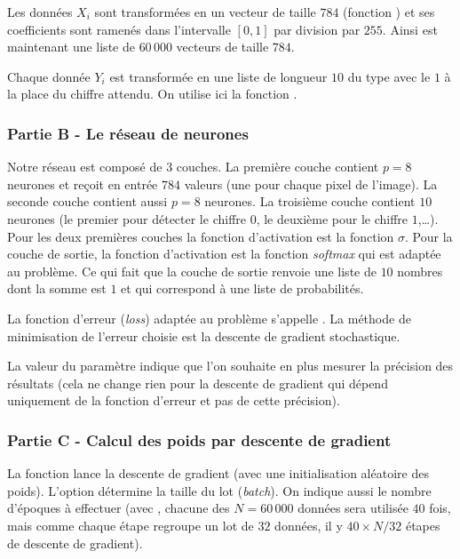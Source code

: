 \documentclass[11pt,class=report,crop=false]{standalone}
\begin{document}
Les données $X_i$ sont transformées en un  vecteur de taille $784$ (fonction ) et ses coefficients sont ramenés dans l'intervalle $[0,1]$ par division par $255$. Ainsi  est maintenant une liste \numpy{} de $60\,000$ vecteurs de taille $784$.

Chaque donnée $Y_i$ est transformée en une liste de longueur $10$ du type \ci{[0,0,...,0,1,0,...,0]} avec le $1$ à la place du chiffre attendu. On utilise ici la fonction .



\subsubsection*{Partie B - Le réseau de neurones}

Notre réseau est composé de $3$ couches.
La première couche contient $p=8$ neurones et reçoit en entrée $784$ valeurs (une pour chaque pixel de l'image). La seconde couche contient aussi $p=8$ neurones. La troisième couche contient $10$ neurones (le premier pour détecter le chiffre $0$, le deuxième pour le chiffre $1$,\ldots).
Pour les deux premières couches la fonction d'activation est la fonction $\sigma$. Pour la couche de sortie, la fonction d'activation est la fonction \emph{softmax} qui est adaptée au problème. Ce qui fait que la couche de sortie renvoie une liste de $10$ nombres dont la somme est $1$  et qui correspond à une liste de probabilités.


La fonction d'erreur (\emph{loss}) adaptée au problème s'appelle . La méthode de minimisation de l'erreur choisie est la descente de gradient stochastique.

La valeur  du paramètre  indique que l'on souhaite en plus mesurer la précision des résultats (cela ne change rien pour la descente de gradient qui dépend uniquement de la fonction d'erreur et pas de cette précision).

\subsubsection*{Partie C - Calcul des poids par descente de gradient}

La fonction  lance la descente de gradient (avec une initialisation aléatoire des poids). L'option  détermine la taille du lot (\emph{batch}). On indique aussi le nombre d'époques à effectuer (avec , chacune des $N = 60\,000$ données sera utilisée $40$ fois, mais comme chaque étape regroupe un lot de $32$ données, il y $40 \times N / 32$ étapes de descente de gradient).
\end{document}
